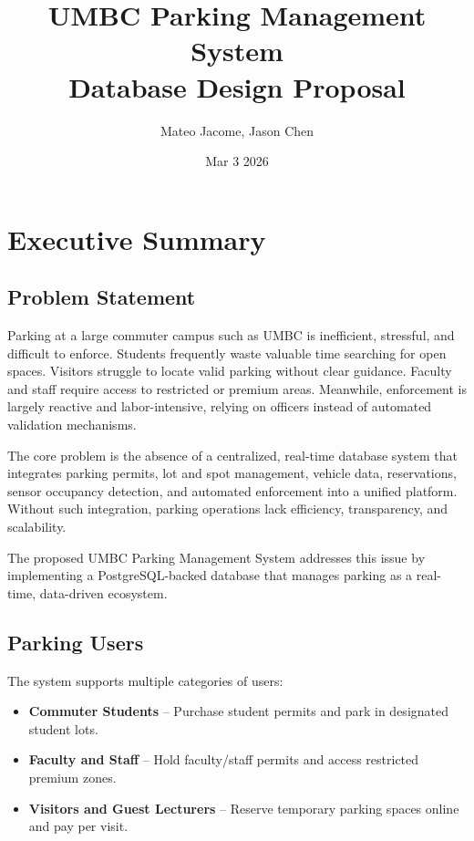 \documentclass[12pt]{report}
\title{UMBC Parking Management System\\Database Design Proposal}
\author{Mateo Jacome, Jason Chen}
\date{Mar 3 2026}
\begin{document}
\maketitle

\section{Executive Summary}

\subsection{Problem Statement}

Parking at a large commuter campus such as UMBC is inefficient, stressful, and difficult to enforce. Students frequently waste valuable time searching for open spaces. Visitors struggle to locate valid parking without clear guidance. Faculty and staff require access to restricted or premium areas. Meanwhile, enforcement is largely reactive and labor-intensive, relying on officers instead of automated validation mechanisms.

The core problem is the absence of a centralized, real-time database system that integrates parking permits, lot and spot management, vehicle data, reservations, sensor occupancy detection, and automated enforcement into a unified platform. Without such integration, parking operations lack efficiency, transparency, and scalability.

The proposed UMBC Parking Management System addresses this issue by implementing a PostgreSQL-backed database that manages parking as a real-time, data-driven ecosystem.

\subsection{Parking Users}

The system supports multiple categories of users:

\begin{itemize}
    \item \textbf{Commuter Students} -- Purchase student permits and park in designated student lots.
    \item \textbf{Faculty and Staff} -- Hold faculty/staff permits and access restricted premium zones.
    \item \textbf{Visitors and Guest Lecturers} -- Reserve temporary parking spaces online and pay per visit.
\end{itemize}
\end{document}
